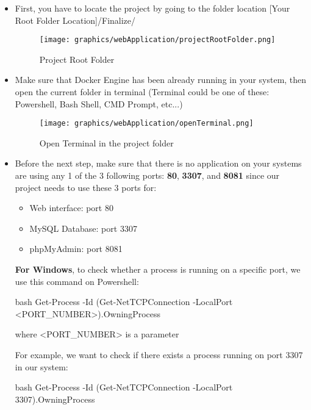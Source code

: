 \begin{itemize}
    \item  First, you have to locate the project by going to the folder location [Your Root Folder Location]/Finalize/

    \begin{figure}[H]
            \centering
            \texttt{[image: graphics/webApplication/projectRootFolder.png]}
            \caption{Project Root Folder}
        \label{fig:projectrootfolder}
    \end{figure}


    \item Make sure that Docker Engine has been already running in your system, then open the current folder in terminal (Terminal could be one of these: Powershell, Bash Shell, CMD Prompt, etc...)

    \begin{figure}[H]
            \centering
            \texttt{[image: graphics/webApplication/openTerminal.png]}
            \caption{Open Terminal in the project folder}
        \label{fig:openTerminal}
    \end{figure}


    \item Before the next step, make sure that there is no application on your systems are using any 1 of the 3 following ports: \textbf{80}, \textbf{3307}, and \textbf{8081} since our project needs to use these 3 ports for:

    \begin{itemize}
        \item Web interface: port 80
        \item MySQL Database: port 3307
        \item phpMyAdmin: port 8081
    \end{itemize}

    \textbf{For Windows}, to check whether a process is running on a specific port, we use this command on Powershell:
    \begin{code}{bash}
        Get-Process -Id (Get-NetTCPConnection -LocalPort <PORT_NUMBER>).OwningProcess
    \end{code}
    where <PORT\_NUMBER> is a parameter

    For example, we want to check if there exists a process running on port 3307 in our system:
    \begin{code}{bash}
        Get-Process -Id (Get-NetTCPConnection -LocalPort 3307).OwningProcess
    \end{code}


\end{itemize}
